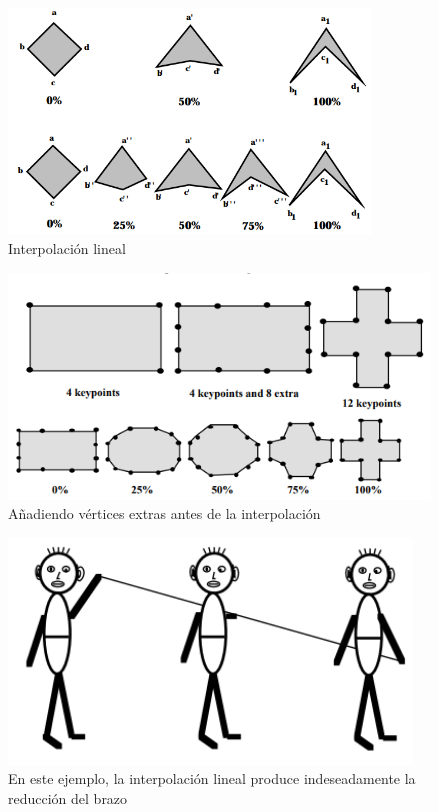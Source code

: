 \documentclass[a4paper,12pt]{report}
\begin{document}
 
\begin{figure}[ht]
    \centering
    \includegraphics[height=6cm]{Imagenes/interpolation_1}
    \caption{Interpolación lineal}
    \label{fig:interpolation_1}
\end{figure}
 
 
\begin{figure}[ht]
    \centering
    \includegraphics[height=6cm]{Imagenes/interpolation_2}
    \caption{Añadiendo vértices extras antes de la interpolación}
    \label{fig:interpolation_2}
\end{figure}
 
 
\begin{figure}[ht]
    \centering
    \includegraphics[height=6cm]{Imagenes/interpolation_3}
    \caption{En este ejemplo, la interpolación lineal produce indeseadamente la reducción del brazo}
    \label{fig:interpolation_3}
\end{figure}
 
\end{document}
